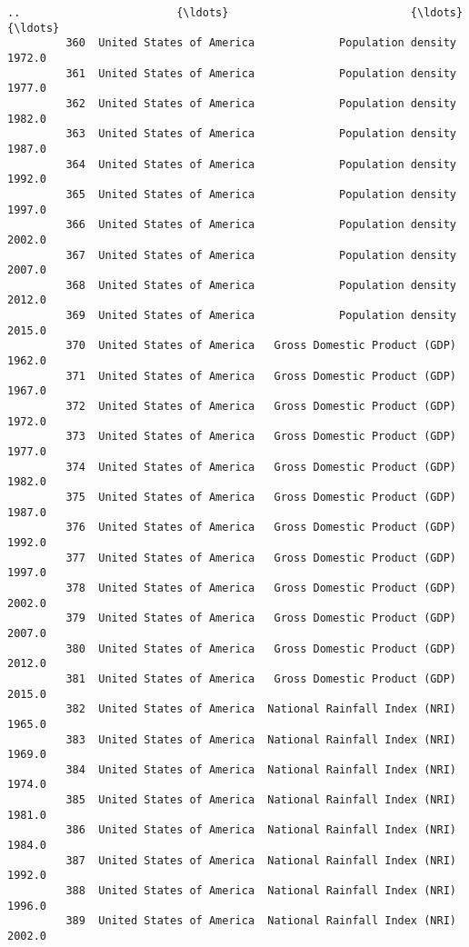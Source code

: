 \documentclass[11pt]{article}
\begin{document}
\begin{Verbatim}[commandchars=\\\{\}]
         ..                        {\ldots}                            {\ldots}     {\ldots}   
         360  United States of America             Population density  1972.0   
         361  United States of America             Population density  1977.0   
         362  United States of America             Population density  1982.0   
         363  United States of America             Population density  1987.0   
         364  United States of America             Population density  1992.0   
         365  United States of America             Population density  1997.0   
         366  United States of America             Population density  2002.0   
         367  United States of America             Population density  2007.0   
         368  United States of America             Population density  2012.0   
         369  United States of America             Population density  2015.0   
         370  United States of America   Gross Domestic Product (GDP)  1962.0   
         371  United States of America   Gross Domestic Product (GDP)  1967.0   
         372  United States of America   Gross Domestic Product (GDP)  1972.0   
         373  United States of America   Gross Domestic Product (GDP)  1977.0   
         374  United States of America   Gross Domestic Product (GDP)  1982.0   
         375  United States of America   Gross Domestic Product (GDP)  1987.0   
         376  United States of America   Gross Domestic Product (GDP)  1992.0   
         377  United States of America   Gross Domestic Product (GDP)  1997.0   
         378  United States of America   Gross Domestic Product (GDP)  2002.0   
         379  United States of America   Gross Domestic Product (GDP)  2007.0   
         380  United States of America   Gross Domestic Product (GDP)  2012.0   
         381  United States of America   Gross Domestic Product (GDP)  2015.0   
         382  United States of America  National Rainfall Index (NRI)  1965.0   
         383  United States of America  National Rainfall Index (NRI)  1969.0   
         384  United States of America  National Rainfall Index (NRI)  1974.0   
         385  United States of America  National Rainfall Index (NRI)  1981.0   
         386  United States of America  National Rainfall Index (NRI)  1984.0   
         387  United States of America  National Rainfall Index (NRI)  1992.0   
         388  United States of America  National Rainfall Index (NRI)  1996.0   
         389  United States of America  National Rainfall Index (NRI)  2002.0   
         

\end{Verbatim}
\end{document}
